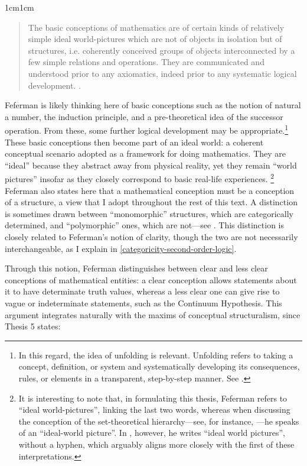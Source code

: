 \documentclass[11pt,a4paper]{book}
\theoremstyle{plain}
\begin{document}
\begin{adjustwidth}{1cm}{1cm}
\begin{quote}
\small
The basic conceptions of mathematics are of certain kinds of relatively simple ideal world-pictures which are not of objects in isolation but of structures, i.e. coherently conceived groups of objects interconnected by a few simple relations and operations. They are communicated and understood prior to any axiomatics, indeed prior to any systematic logical development. \textcite[p. 11]{Feferman2011a}.
\end{quote}
\end{adjustwidth}

Feferman is likely thinking here of basic conceptions such as the notion of natural a number, the induction principle, and a pre-theoretical idea of the successor operation. From these, some further logical development may be appropriate.\footnote{In this regard, the idea of unfolding is relevant. Unfolding refers to taking a concept, definition, or system and systematically developing its consequences, rules, or elements in a transparent, step-by-step manner. See \textcite{FefermanStrahm2000}.} These basic conceptions then become part of an ideal world: a coherent conceptual scenario adopted as a framework for doing mathematics. They are “ideal” because they abstract away from physical reality, yet they remain “world pictures” insofar as they closely correspond to basic real-life experiences. \footnote{It is interesting to note that, in formulating this thesis, Feferman refers to “ideal world-pictures”, linking the last two words, whereas when discussing the conception of the set-theoretical hierarchy—see, for instance, \textcite[p.~19]{Feferman2011a}—he speaks of an “ideal-world picture”. In \textcite[p.~19]{Feferman2011b}, however, he writes “ideal world pictures”, without a hyphen, which arguably aligns more closely with the first of these interpretations.} Feferman also states here that a mathematical conception must be a conception of a structure, a view that I adopt throughout the rest of this text. A distinction is sometimes drawn between “monomorphic” structures, which are categorically determined, and “polymorphic” ones, which are not—see \textcite[133]{Ferreiros2023ConStructuralism}. This distinction is closely related to Feferman's notion of clarity, though the two are not necessarily interchangeable, as I explain in \ref{categoricity-second-order-logic}.

Through this notion, Feferman distinguishes between clear and less clear conceptions of mathematical entities: a clear conception allows statements about it to have determinate truth values, whereas a less clear one can give rise to vague or indeterminate statements, such as the Continuum Hypothesis. This argument integrates naturally with the maxims of conceptual structuralism, since Thesis 5 states:
\end{document}
